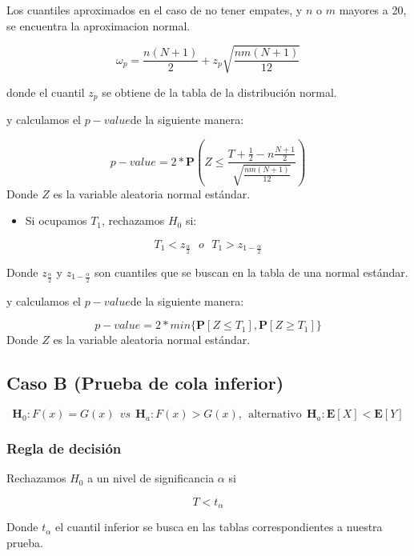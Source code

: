 \documentclass[
  a4paper,
  oneside,
  openany]{book}
\providecommand{\tightlist}{%
  \setlength{\itemsep}{0pt}\setlength{\parskip}{0pt}}
\begin{document}
Los cuantiles aproximados en el caso de no tener empates, y \(n\) o \(m\) mayores a 20, se encuentra la aproximacion normal.

\[\omega_p= \frac{n(N+1)}{2} + z_p\sqrt{\frac{n m(N+1)}{12}}\]

donde el cuantil \(z_p\) se obtiene de la tabla de la distribución normal.

y calculamos el \(p-value\)de la siguiente manera:

\[p-value = 2*\mathbf{P}\left(Z\leq\frac{T+\frac{1}{2}-n\frac{N+1}{2}}{\sqrt{\frac{nm(N+1)}{12}}}\right)\]
Donde \(Z\) es la variable aleatoria normal estándar.

\begin{itemize}
\tightlist
\item
  Si ocupamos \(T_{1}\), rechazamos \(H_0\) si:
\end{itemize}

\[T_{1} < z_{\frac{\alpha}{2}} \ \ \  o \ \ \  T_{1} > z_{1-\frac{\alpha}{2}}\]

Donde \(z_\frac{\alpha}{2}\) y \(z_{1-\frac{\alpha}{2}}\) son cuantiles que se buscan en la tabla de una normal estándar.

y calculamos el \(p-value\)de la siguiente manera:

\[p-value=2*min\{\mathbf{P}[Z\leq T_{1}],\mathbf{P}[Z\geq T_{1}]\}\]
Donde \(Z\) es la variable aleatoria normal estándar.

\hypertarget{caso-b-prueba-de-cola-inferior-4}{%
\subsection*{Caso B (Prueba de cola inferior)}\label{caso-b-prueba-de-cola-inferior-4}}


\[\textbf{H}_0: F(x) = G(x) \ \ vs \ \ \textbf{H}_a: F(x) > G(x),  \ \ \mbox{alternativo} \ \ \textbf{H}_a:\mathbf{E}[X]  < \mathbf{E}[Y]\]

\hypertarget{regla-de-decisiuxf3n-14}{%
\subsubsection*{Regla de decisión}\label{regla-de-decisiuxf3n-14}}


Rechazamos \(H_0\) a un nivel de significancia \(\alpha\) si

\[T < t_{\alpha}\]

Donde \(t_{\alpha}\) el cuantil inferior se busca en las tablas correspondientes a nuestra prueba.
\end{document}
